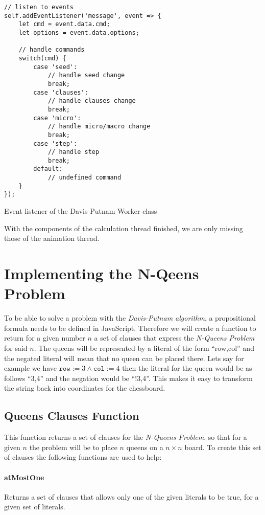 \begin{listing}[h!]
\begin{verbatim}
// listen to events
self.addEventListener('message', event => {
    let cmd = event.data.cmd;
    let options = event.data.options;

    // handle commands
    switch(cmd) {
        case 'seed':
            // handle seed change
            break;
        case 'clauses':
            // handle clauses change
            break;
        case 'micro':
            // handle micro/macro change
            break;
        case 'step':
            // handle step
            break;
        default:
            // undefined command
    }
});
\end{verbatim}
    \caption{Event listener of the Davis-Putnam Worker class}
    \label{code:workerListener}
\end{listing}

With the components of the calculation thread finished, we are only missing those of the animation thread.

\section{Implementing the N-Qeens Problem}
\label{sec:impQueens}
To be able to solve a problem with the \textit{Davis-Putnam algorithm}, a propositional formula needs to be defined in JavaScript. Therefore we will create a function to return for a given number $n$ a set of clauses that express the \textit{N-Queens Problem} for said $n$. The queens will be represented by a literal of the form ``row,col'' and the negated literal will mean that no queen can be placed there. Lets say for example we have $\texttt{row} := 3 \land \texttt{col} := 4$ then the literal for the queen would be as follows ``3,4'' and the negation would be ``!3,4''. This makes it easy to transform the string back into coordinates for the chessboard.

\subsection{Queens Clauses Function}
\label{sub:impQueensClauses}
This function returns a set of clauses for the \textit{N-Queens Problem}, so that for a given $n$ the problem will be to place $n$ queens on a $n \times n$ board. To create this set of clauses the following functions are used to help:

\paragraph{atMostOne}
Returns a set of clauses that allows only one of the given literals to be true, for a given set of literals.

